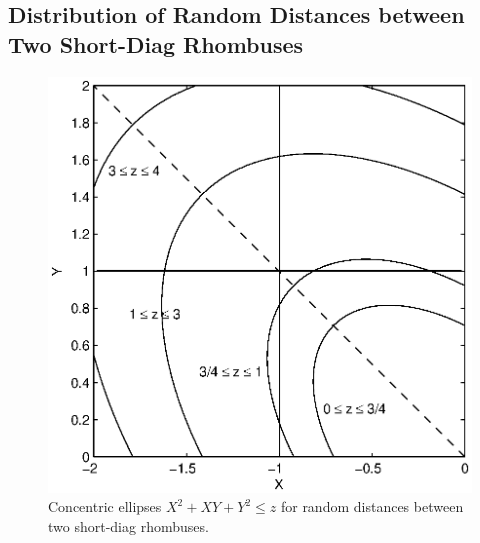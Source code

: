 \documentclass[12pt,draftclsnofoot,onecolumn]{IEEEtran}
\begin{document}
\subsection{Distribution of Random Distances between Two Short-Diag Rhombuses}

\begin{figure}
  \centering
  \includegraphics[width=0.5\columnwidth]{fig/rhombus_diag2}
  \caption{Concentric ellipses $X^2+XY+Y^2 \leq z$ for random distances between two short-diag rhombuses.}
  \label{fig:diag2}
\end{figure}
\end{document}
